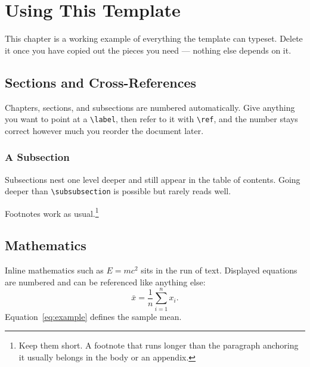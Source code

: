 
\chapter{Using This Template}\label{chap:template}

This chapter is a working example of everything the template can typeset.
Delete it once you have copied out the pieces you need --- nothing else depends
on it.

\section{Sections and Cross-References}

Chapters, sections, and subsections are numbered automatically. Give anything
you want to point at a \verb|\label|, then refer to it with \verb|\ref|, and
the number stays correct however much you reorder the document later.

\subsection{A Subsection}

Subsections nest one level deeper and still appear in the table of contents.
Going deeper than \verb|\subsubsection| is possible but rarely reads well.

Footnotes work as usual.\footnote{Keep them short. A footnote that runs longer
than the paragraph anchoring it usually belongs in the body or an appendix.}

\section{Mathematics}

Inline mathematics such as $E = mc^2$ sits in the run of text. Displayed
equations are numbered and can be referenced like anything else:
%
\begin{equation}
\label{eq:example}
\bar{x} = \frac{1}{n} \sum_{i=1}^{n} x_i .
\end{equation}
%
Equation~\eqref{eq:example} defines the sample mean.

